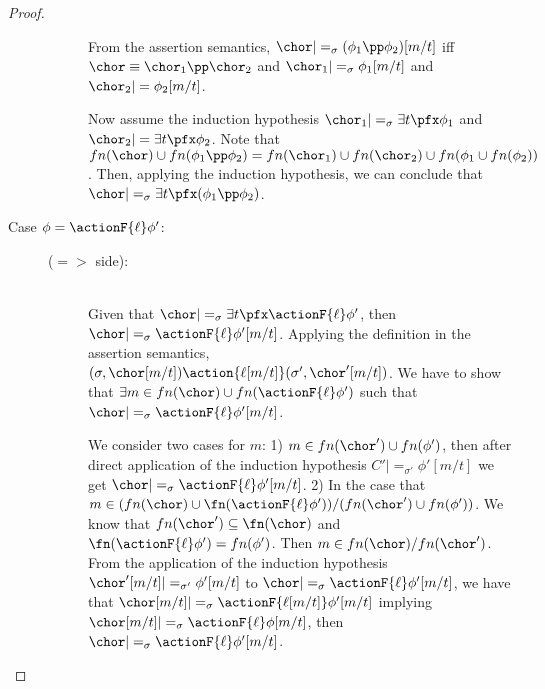 \begin{proof}
\begin{description}
\begin{description}
                From the assertion semantics, $\chor |=_\sigma
                (\phi_1 \pp \phi_2)[m/t]$ iff $\chor \equiv \chor_1
                \pp \chor_2$ and $\chor_1 |=_\sigma \phi_1[m/t]$ and
                $\chor_2 |= \phi_2 [m/t]$. 

                Now assume the induction hypothesis  $\chor_1 |=_\sigma
                \exists t \pfx \phi_1$ and $\chor_2 |= \exists t \pfx
                \phi_2$. Note  that $fn(\chor) \cup fn(\phi_1 \pp
                \phi_2) = fn(\chor_1) \cup fn(\chor_2) \cup fn(\phi_1
                \cup fn(\phi_2))$. Then, applying the induction hypothesis, we can
                conclude that $\chor |=_\sigma \exists t \pfx (\phi_1
                \pp \phi_2)$.
           \end{description}
      \item[Case $\phi = \actionF{\ell}\phi' $:] \hfill 
        \begin{description}
          \item[($=>$ side):] \hfill \\
            Given that $\chor |=_\sigma \exists t \pfx \actionF{\ell}
            \phi'$, then $\chor |=_\sigma \actionF{\ell}
            \phi'[m/t]$. Applying the definition in the assertion
            semantics, $(\sigma, \chor[m/t]) \action{\ell[m/t]}
            (\sigma',\chor'[m/t])$.  We have to show that $\exists m
            \in fn(\chor) \cup fn(\actionF{\ell}\phi')$ such that $\chor
            |=_\sigma \actionF{\ell} \phi'[m/t]$.

            We consider two cases for $m$: 1) $m \in fn(\chor') \cup
            fn(\phi') $, then after direct application of the
            induction hypothesis $C' |=_{\sigma'} \phi'[m/t]$ we get
            $\chor |=_\sigma \actionF{\ell} \phi'[m/t]$. 2)  In the
            case that $m \in (fn(\chor) \cup
            \fn(\actionF{\ell}\phi'))/(fn(\chor') \cup fn(\phi'))$.
            We know  that $fn(\chor') \subseteq \fn(\chor)$ and
            $\fn(\actionF{\ell} \phi') = fn(\phi')$. Then $m \in
            fn(\chor)/fn(\chor')$. From the application of  the  induction hypothesis
            $\chor'[m/t] |=_{\sigma'} \phi'[m/t]$ to  $\chor |=_\sigma \actionF{\ell} \phi'[m/t]$, we have that $\chor[m/t]
            |=_\sigma \actionF{\ell[m/t]}\phi'[m/t]$ implying 
            $\chor[m/t] |=_\sigma \actionF{\ell} \phi[m/t]$, 
             then $\chor |=_\sigma
            \actionF{\ell} \phi'[m/t]$.


\end{description}
\end{description}
\end{proof}
